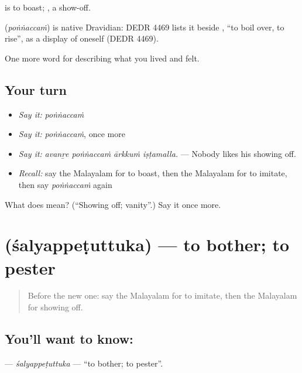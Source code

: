   is to boast; , a show-off.

\begin{cousinweb}
\textbf{} (\emph{poṅṅaccaṁ}) is native Dravidian: DEDR 4469 lists it beside , \textquotedblleft{}to boil over, to rise\textquotedblright{}, as a display of oneself (DEDR 4469).
\end{cousinweb}

\begin{grammarlens}[title={What you've built}]
One more word for describing what you lived and felt.
\end{grammarlens}

\subsection*{Your turn}
\begin{itemize}
\raggedright
  \item \emph{Say it:} \emph{poṅṅaccaṁ}
  \item \emph{Say it:} \emph{poṅṅaccaṁ}, once more
  \item \emph{Say it:} \emph{avanṟe poṅṅaccaṁ ārkkuṁ iṣṭamalla.} — Nobody likes his showing off.
  \item \emph{Recall:} say the Malayalam for to boast, then the Malayalam for to imitate, then say \emph{poṅṅaccaṁ} again
\end{itemize}

\begin{tcolorbox}[breakable,colback=teal!4,colframe=teal!35!black,title={Before you move on}]
What does  mean? (\textquotedblleft{}Showing off; vanity\textquotedblright{}.) Say it once more.
\end{tcolorbox}
\section[\texorpdfstring{\ml{ശല്യപ്പെടുത്തുക} (śalyappeṭuttuka)}{ശല്യപ്പെടുത്തുക (śalyappeṭuttuka)}]{ (śalyappeṭuttuka) — to bother; to pester}

\label{lesson:ML-C531-salyappetuttuka}



\begin{quote}
Before the new one: say the Malayalam for to imitate, then the Malayalam for showing off.
\end{quote}

\subsection*{You'll want to know: }
\textbf{} — \emph{śalyappeṭuttuka} — \textquotedblleft{}to bother; to pester\textquotedblright{}.


